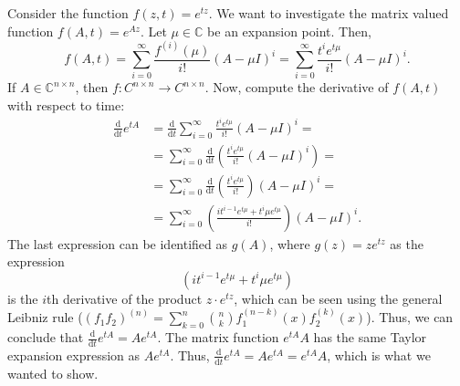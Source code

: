 Consider the function $f(z,t) = e^{tz}$. We want to investigate the matrix valued function $f(A,t) = e^{Az}$. Let $\mu \in \mathbb{C}$ be an expansion point. Then,
\begin{equation}
  f(A,t) = \sum\limits_{i = 0}^{\infty} \frac{f^{(i)}(\mu)}{i!}(A-\mu I)^{i} = \sum\limits_{i = 0}^{\infty} \frac{t^ie^{t\mu}}{i!}(A-\mu I)^{i}.
\end{equation}
If $A\in\mathbb{C}^{n\times n}$, then $f:C^{n \times n}\rightarrow C^{n \times n}$. Now, compute the derivative of $f(A,t)$ with respect to time:
\begin{equation}
\begin{aligned}
\frac{\mathrm d}{\mathrm d t}e^{tA} & = \frac{\mathrm d}{\mathrm dt}\sum^{\infty}_{i = 0} \frac{t^ie^{t\mu}}{i!}(A-\mu I )^i = \\
& = \sum^{\infty}_{i = 0} \frac{\mathrm d}{\mathrm dt}\left(\frac{t^ie^{t\mu}}{i!}(A-\mu I )^i\right) = \\
& = \sum^{\infty}_{i = 0} \frac{\mathrm d}{\mathrm dt}\left(\frac{t^ie^{t\mu}}{i!}\right)(A-\mu I )^i  = \\
&= \sum^{\infty}_{i = 0}  \left(\frac{it^{i-1}e^{t\mu}+t^i\mu e^{t\mu}}{i!}\right) (A-\mu I )^i.
\end{aligned}
\end{equation}
The last expression can be identified as $g(A)$, where $g(z) = ze^{tz}$ as  the expression
\begin{equation}
\left(it^{i-1}e^{t\mu}+t^i\mu e^{t\mu}\right)
\end{equation}
is the $i$th derivative of the product $z\cdot e^{tz}$, which can be seen using the general Leibniz rule ($(f_1f_2)^{(n)} = \sum_{k = 0}^n\binom{n}{k}f_1^{(n-k)}(x)f_2^{(k)}(x)$). Thus, we can conclude that $\frac{\mathrm d }{\mathrm dt}e^{tA} = Ae^{tA}$. The matrix function $e^{tA}A$ has the same Taylor expansion expression as $Ae^{tA}$. Thus, $\frac{\mathrm d }{\mathrm dt}e^{tA} = Ae^{tA} = e^{tA} A$, which is what we wanted to show.





